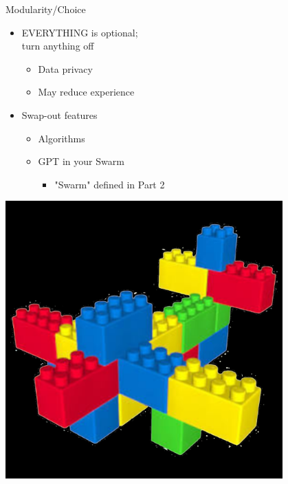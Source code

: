 \documentclass[aspectratio=35]{beamer} %
\begin{document}
\begin{frame}{Modularity/Choice}
\vspace{-0.3in}
\begin{itemize}
    \item EVERYTHING is optional; \\turn anything off
    \begin{itemize}
        \item Data privacy
        \item May reduce experience
    \end{itemize}
    \item Swap-out features
    \begin{itemize}
        \item Algorithms
        \item GPT in your Swarm
        \begin{itemize}
            \item "Swarm" defined in Part 2
        \end{itemize}
    \end{itemize}
\end{itemize}
\centering
\includegraphics[width=0.8\textwidth]{imgs/power_to_people/legos.png}
\end{frame}
\end{document}
